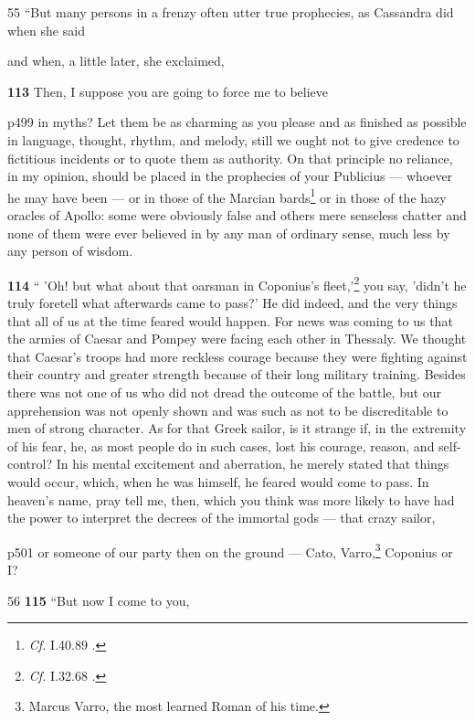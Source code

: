 55
``But many persons in a frenzy often utter true prophecies, as Cassandra did when she said

and when, a little later, she exclaimed,

\textbf{113} Then, I suppose you are going to force me to believe

p499 in myths? Let them be as charming as you please and as finished as possible in language, thought, rhythm, and melody, still we ought not to give credence to fictitious incidents or to quote them as authority. On that principle no reliance, in my opinion, should be placed in the prophecies of your Publicius\texthebrew{ —} whoever he may have been \texthebrew{—} or in those of the Marcian bards\texthebrew{}\footnote{\emph{Cf.}
I.40.89 .

} or in those of the hazy oracles of Apollo:\texthebrew{} some were obviously false and others mere senseless chatter and none of them were ever believed in by any man of ordinary sense, much less by any person of wisdom.

\textbf{114} `` 'Oh! but what about that oarsman in Coponius's fleet,'\texthebrew{}\footnote{\emph{Cf.}
I.32.68 .

} you say, 'didn't he truly foretell what afterwards came to pass?' He did indeed, and the very things that all of us at the time feared would happen. For news was coming to us that the armies of Caesar and Pompey were fa­cing each other in Thessaly. We thought that Caesar's troops had more reckless courage because they were fighting against their country and greater strength because of their long military training. Besides there was not one of us who did not dread the outcome of the battle, but our apprehension was not openly shown and was such as not to be discreditable to men of strong character. As for that Greek sailor, is it strange if, in the extremity of his fear, he, as most people do in such cases, lost his courage, reason, and self-control? In his mental excitement and aberration, he merely stated that things would occur, which, when he was himself, he feared would come to pass. In heaven's name, pray tell me, then, which you think was more likely to have had the power to interpret the decrees of the immortal gods \texthebrew{—} that crazy sailor,

p501 or someone of our party then on the ground \texthebrew{—} Cato, Varro,\texthebrew{}\footnote{Marcus Varro, the most learned Roman of his time.

} Coponius or I?

56
\textbf{115} ``But now I come to you,

